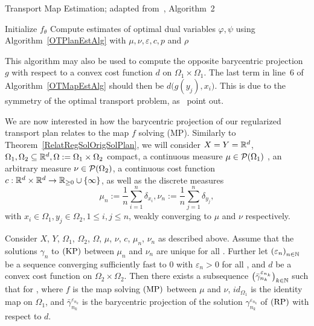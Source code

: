 \begin{algorithm}\label{OTMapEstAlg}
	\caption{Transport Map Estimation; adapted from~\cite{Seg2018}, Algorithm~2}
	Initialize $f_\theta$\;
	Compute estimates of optimal dual variables $\varphi, \psi$ using Algorithm~\ref{OTPlanEstAlg} with $\mu, \nu, \varepsilon, c, p$ and $\rho$\;
\end{algorithm}

This algorithm may also be used to compute the opposite barycentric projection $g$ with respect to a convex cost function $d$ on $\Omega_1 \times \Omega_1$. The last term in line~6 of Algorithm~\ref{OTMapEstAlg} should then be $d\big( g(y_j), x_i \big)$. This is due to the symmetry of the optimal transport problem, as~\cite{Seg2018} point out.

We are now interested in how the barycentric projection of our regularized transport plan relates to the map $f$ solving (MP). Similarly to Theorem~\ref{RelatRegSolOrigSolPlan}, we will consider $X = Y = \R^d$, $\Omega_1, \Omega_2 \subseteq \R^d, \Omega := \Omega_1 \times \Omega_2$ compact, a continuous measure $\mu \in \PM{\Omega_1}$ , an arbitrary measure $\nu \in \PM{\Omega_2}$, a continuous cost function $\map[c]{\R^d \times \R^d}{\RZero \cup \{ \infty \}}$, as well as the discrete measures
\[ \mu_n := \frac{1}{n} \sum\limits_{i = 1}^n \delta_{x_i}, \nu_n := \frac{1}{n} \sum\limits_{j = 1}^n \delta_{y_j}, \]
with $x_i \in \Omega_1, y_j \in \Omega_2, 1 \le i, j \le n$, weakly converging to $\mu$ and $\nu$ respectively.

\begin{theorem}\label{RelatRegSolOrigSolMap}
	Consider $X$, $Y$, $\Omega_1$, $\Omega_2$, $\Omega$, $\mu$, $\nu$, $c$, $\mu_n$, $\nu_n$ as described above. Assume that the solutions $\gamma_n$ to$\text{\normalfont\ (KP)}$ between $\mu_n$ and $\nu_n$ are unique for all \NinN. Further let ${(\varepsilon_n)}_{\NinN}$ be a sequence converging sufficiently fast to $0$ with $\varepsilon_n > 0$ for all \NinN, and $d$ be a convex cost function on $\Omega_2 \times \Omega_2$. Then there exists a subsequence ${\big(\bar{\gamma}^{\varepsilon_{n_k}}_{n_k}\big)}_{\NinN[k]}$ such that  for \Ninf, where $f$ is the map solving$\text{\normalfont\ (MP)}$ between $\mu$ and $\nu$, $id_{\Omega_1}$ is the identity map on $\Omega_1$, and $\bar{\gamma}^{\varepsilon_{n_k}}_{n_k}$ is the barycentric projection of the solution $\gamma^{\varepsilon_{n_k}}_{n_k}$ of$\text{\normalfont\ (RP)}$ with respect to $d$.
\end{theorem}


